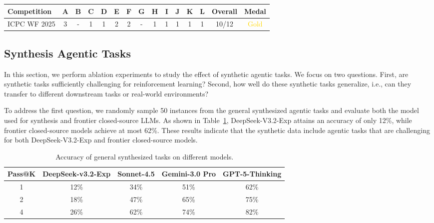 \documentclass[11pt, a4paper, logo, copyright, nonumbering]{deepseek}
\def\newmodel{DeepSeek-V3.2}
\begin{document}
\begin{CJK*}{UTF8}{gbsn}
\begin{table}[htbp]
\vspace{1em}

\setlength{\tabcolsep}{4pt}
\begin{tabular}{lcccccccccccc cc}
\toprule
\textbf{Competition} & \textbf{A} & \textbf{B} & \textbf{C} & \textbf{D} & \textbf{E} & \textbf{F} & \textbf{G} & \textbf{H} & \textbf{I} & \textbf{J} & \textbf{K} & \textbf{L} & \textbf{Overall} & \textbf{Medal} \\
\midrule
ICPC WF 2025 & 3 & - & 1 & 1 & 2 & 2 & - & 1 & 1  & 1 & 1 & 1 & 10/12 & \textcolor{gold}{Gold} \\
\bottomrule
\end{tabular}
\end{table}

\subsection{Synthesis Agentic Tasks}
In this section, we perform ablation experiments to study the effect of synthetic agentic tasks. We focus on two questions. First, are synthetic tasks sufficiently challenging for reinforcement learning? Second, how well do these synthetic tasks generalize, i.e., can they transfer to different downstream tasks or real-world environments?

To address the first question, we randomly sample 50 instances from the general synthesized agentic tasks and evaluate both the model used for synthesis and frontier closed-source LLMs. As shown in Table~\ref{tab:synthesis-eval}, \newmodel-Exp attains an accuracy of only 12\%, while frontier closed-source models achieve at most 62\%. These results indicate that the synthetic data include agentic tasks that are challenging for both \newmodel-Exp and frontier closed-source models.
\begin{table}[h]
    \centering
    \footnotesize
    \caption{ \centering Accuracy of general synthesized tasks on different models.}
    \begin{tabular}{c | c  c c c }
    \toprule
     Pass@K& DeepSeek-v3.2-Exp & Sonnet-4.5  &Gemini-3.0 Pro & GPT-5-Thinking\\
    \midrule
    1& 12\%&34\%&51\%& 62\%  \\
    \midrule
    2& 18\% &47\%& 65\%&75\%  \\
    \midrule
    4& 26\%&62\%&74\% & 82\% \\
    \bottomrule
    \end{tabular}
    
    \label{tab:synthesis-eval}
\end{table}


\end{CJK*}
\end{document}
